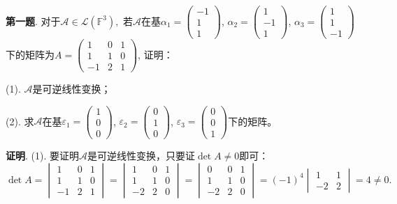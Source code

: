 
\renewcommand{\newpageorvspace}{\vspace{2em}}

\date{2022-4-22  第四次习题课}



\maketitle

{\bf 第一题}. 对于$\mathscr{A} \in \mathcal{L}(\mathbb{F}^3),$ 若$\mathscr{A}$在基$\alpha_1 = \begin{pmatrix} -1 \\ 1 \\ 1 \end{pmatrix}$, $\alpha_2 = \begin{pmatrix} 1 \\ -1 \\ 1 \end{pmatrix}$, $\alpha_3 = \begin{pmatrix} 1 \\ 1 \\ -1 \end{pmatrix}$下的矩阵为$A = \begin{pmatrix} 1 & 0 & 1 \\ 1 & 1 & 0 \\ -1 & 2 & 1 \end{pmatrix}$, 证明：

(1). $\mathscr{A}$是可逆线性变换；

(2). 求$\mathscr{A}$在基$\varepsilon_1 = \begin{pmatrix} 1 \\ 0 \\ 0 \end{pmatrix}$, $\varepsilon_2 = \begin{pmatrix} 0 \\ 1 \\ 0 \end{pmatrix}$, $\varepsilon_3 = \begin{pmatrix} 0 \\ 0 \\ 1 \end{pmatrix}$下的矩阵。

{\bf 证明}. (1). 要证明$\mathscr{A}$是可逆线性变换，只要证$\det A \neq 0$即可：
$$\det A = \begin{vmatrix} 1 & 0 & 1 \\ 1 & 1 & 0 \\ -1 & 2 & 1 \end{vmatrix} = \begin{vmatrix} 1 & 0 & 1 \\ 1 & 1 & 0 \\ -2 & 2 & 0 \end{vmatrix} = \begin{vmatrix} 0 & 0 & 1 \\ 1 & 1 & 0 \\ -2 & 2 & 0 \end{vmatrix} = (-1)^4 \begin{vmatrix} 1 & 1 \\ -2 & 2 \end{vmatrix} = 4 \neq 0.$$

